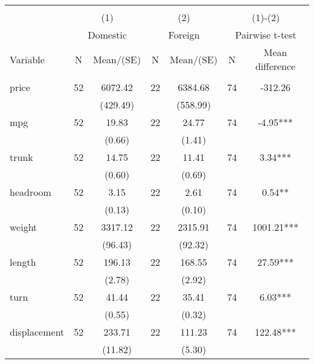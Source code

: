 
\begin{tabular}{@{\extracolsep{5pt}}lcccccc}
\\[-1.8ex]\hline \hline \\[-1.8ex]
 & \multicolumn{2}{c}{(1)}  & \multicolumn{2}{c}{(2)}  & \multicolumn{2}{c}{(1)-(2)} \\
 & \multicolumn{2}{c}{Domestic}  & \multicolumn{2}{c}{Foreign}  & \multicolumn{2}{c}{Pairwise t-test}  \\
Variable & N & Mean/(SE) & N & Mean/(SE) & N & Mean difference \\ \hline \\[-1.8ex] 
price   & 52    & 6072.42    & 22    & 6384.68    & 74    & -312.26   \\
 &   & (429.49)  &   & (558.99)  &   &  \\ [1ex]
mpg   & 52    & 19.83    & 22    & 24.77    & 74    & -4.95***   \\
 &   & (0.66)  &   & (1.41)  &   &  \\ [1ex]
trunk   & 52    & 14.75    & 22    & 11.41    & 74    & 3.34***   \\
 &   & (0.60)  &   & (0.69)  &   &  \\ [1ex]
headroom   & 52    & 3.15    & 22    & 2.61    & 74    & 0.54**   \\
 &   & (0.13)  &   & (0.10)  &   &  \\ [1ex]
weight   & 52    & 3317.12    & 22    & 2315.91    & 74    & 1001.21***   \\
 &   & (96.43)  &   & (92.32)  &   &  \\ [1ex]
length   & 52    & 196.13    & 22    & 168.55    & 74    & 27.59***   \\
 &   & (2.78)  &   & (2.92)  &   &  \\ [1ex]
turn   & 52    & 41.44    & 22    & 35.41    & 74    & 6.03***   \\
 &   & (0.55)  &   & (0.32)  &   &  \\ [1ex]
displacement   & 52    & 233.71    & 22    & 111.23    & 74    & 122.48***   \\
 &   & (11.82)  &   & (5.30)  &   &  \\ [1ex]

\end{tabular}

